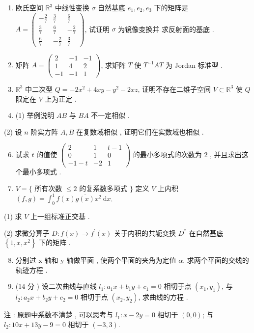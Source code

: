 \documentclass[10pt]{article}
\begin{document}
\begin{enumerate}
  \item  欧氏空间  $\mathbb{R}^{3}$  中线性变换  $\sigma$  自然基底  $e_{1}, e_{2}, e_{3}$  下的矩阵是  $A=\left(\begin{array}{rrr}-\frac{2}{7} & \frac{3}{7} & \frac{6}{7} \\ \frac{3}{7} & \frac{6}{7} & -\frac{2}{7} \\ \frac{6}{7} & -\frac{2}{7} & \frac{3}{7}\end{array}\right)$,  试证明  $\sigma$  为镜像变换并   求反射面的基底 .

  \item  矩阵  $A=\left(\begin{array}{rrr}2 & -1 & -1 \\ 1 & 4 & 2 \\ -1 & -1 & 1\end{array}\right)$,  求矩阵  $T$  使  $T^{-1} A T$  为  Jordan  标准型 .

  \item $\mathbb{R}^{3}$  中二次型  $Q=-2 x^{2}+4 x y-y^{2}-2 x z$,  证明不存在二维子空间  $V \subset \mathbb{R}^{3}$  使  $Q$  限定在  $V$  上为正定 .

  \item (1)  举例说明  $A B$  与  $B A$  不一定相似 .

\end{enumerate}
(2)  设  $n$  阶实方阵  $A, B$  在复数域相似 ,  证明它们在实数域也相似 .

\begin{enumerate}
  \setcounter{enumi}{5}
  \item  试求  $t$  的值使  $\left(\begin{array}{ccc}2 & 1 & t-1 \\ 0 & 1 & 0 \\ -1-t & -2 & 1\end{array}\right)$  的最小多项式的次数为  2 ,  并且求出这个最小多项式 .

  \item $V=\{$  所有次数  $\leq 2$  的复系数多项式  $\}$  定义  $V$  上内积  $(f, g)=\int_{0}^{1} f(x) \overline{g(x)} x^{2} \mathrm{~d} x$.

\end{enumerate}
(1)  求  $V$  上一组标准正交基 .

(2)  求微分算子  $D: f(x) \rightarrow f^{\prime}(x)$  关于内积的共轭变换  $D^{*}$  在自然基底  $\left\{1, x, x^{2}\right\}$  下的矩阵 .

\begin{enumerate}
  \setcounter{enumi}{7}
  \item  分别过  $\mathrm{x}$  轴和  $\mathrm{y}$  轴做平面 ,  使两个平面的夹角为定值  $\alpha$.  求两个平面的交线的轨迹方程 .

  \item (14  分 )  设二次曲线与直线  $l_{1}: a_{1} x+b_{1} y+c_{1}=0$  相切于点  $\left(x_{1}, y_{1}\right)$,  与  $l_{2}: a_{2} x+b_{2} y+c_{2}=0$  相切于点  $\left(x_{2}, y_{2}\right)$,  求曲线的方程 .

\end{enumerate}
 注 :  原题中系数不清楚 ,  可以思考与  $l_{1}: x-2 y=0$  相切于  $(0,0)$;  与  $l_{2}: 10 x+13 y-9=0$  相切于  $(-3,3)$.
\end{document}
